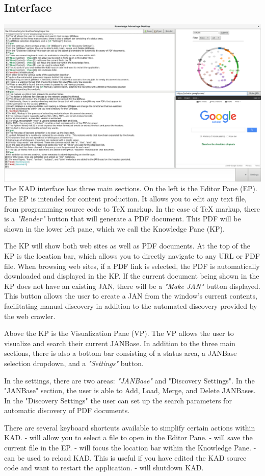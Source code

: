 \documentclass{article}
\begin{document}
\begin{doublespace}
\section{Interface}
\includegraphics[width=6in]{images/kad-overview.png}\\
The KAD interface has three main sections.
On the left is the Editor Pane (EP).
The EP is intended for content production.
It allows you to edit any text file, from programming source code to TeX markup.
In the case of TeX markup, there is a {\it "Render"} button that will generate a PDF document.
This PDF will be shown in the lower left pane, which we call the Knowledge Pane (KP).
\par
The KP will show both web sites as well as PDF documents.
At the top of the KP is the location bar, which allows you to directly navigate to any URL or PDF file.
When browsing web sites, if a PDF link is selected, the PDF is automatically downloaded and displayed
in the KP.
If the current document being shown in the KP does not have an existing JAN, there will be a
{\it "Make JAN"} button displayed.
This button allows the user to create a JAN from the window's current contents,
facilitating manual discovery in addition to the automated discovery provided by the web crawler.
\par
Above the KP is the Visualization Pane (VP).
The VP allows the user to visualize and search their current JANBase.
In addition to the three main sections, there is also a bottom bar consisting of a status area,
a JANBase selection dropdown, and a {\it "Settings"} button.
\par
In the settings, there are two areas: {\it "JANBase"} and {\lt "Discovery Settings"}.
In the "JANBase" section, the user is able to Add, Load, Merge, and Delete JANBases.
In the "Discovery Settings" the user can set up the search parameters for automatic discovery of PDF documents.
\par
There are several keyboard shortcuts available to simplify certain actions within KAD.
 -  will allow you to select a file to open in the Editor Pane.
 -  will save the current file in the EP.
 -  will focus the location bar within the Knowledge Pane.
 -  can be used to reload KAD.
This is useful if you have edited the KAD source code and want to restart the application.
 -  will shutdown KAD.

\end{doublespace}
\end{document}
